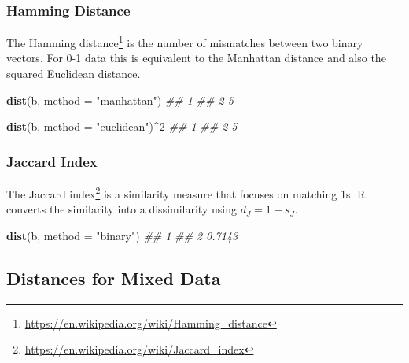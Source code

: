 \documentclass[
  notitlepage]{book}
\newenvironment{Shaded}{\begin{snugshade}}{\end{snugshade}}
\newcommand{\CommentTok}[1]{\textcolor[rgb]{0.56,0.35,0.01}{\textit{#1}}}
\newcommand{\DataTypeTok}[1]{\textcolor[rgb]{0.13,0.29,0.53}{#1}}
\newcommand{\DecValTok}[1]{\textcolor[rgb]{0.00,0.00,0.81}{#1}}
\newcommand{\KeywordTok}[1]{\textcolor[rgb]{0.13,0.29,0.53}{\textbf{#1}}}
\newcommand{\NormalTok}[1]{#1}
\newcommand{\OperatorTok}[1]{\textcolor[rgb]{0.81,0.36,0.00}{\textbf{#1}}}
\newcommand{\StringTok}[1]{\textcolor[rgb]{0.31,0.60,0.02}{#1}}
\DeclareRobustCommand{\href}[2]{#2\footnote{\url{#1}}}
\begin{document}
\hypertarget{hamming-distance}{%
\subsubsection{Hamming Distance}\label{hamming-distance}}

The \href{https://en.wikipedia.org/wiki/Hamming_distance}{Hamming distance}
is the number of mismatches between two binary vectors. For 0-1 data
this is equivalent to the Manhattan distance and also the squared
Euclidean distance.

\begin{Shaded}
\begin{Highlighting}[]
\KeywordTok{dist}\NormalTok{(b, }\DataTypeTok{method =} \StringTok{"manhattan"}\NormalTok{)}
\CommentTok{\#\#   1}
\CommentTok{\#\# 2 5}
\end{Highlighting}
\end{Shaded}

\begin{Shaded}
\begin{Highlighting}[]
\KeywordTok{dist}\NormalTok{(b, }\DataTypeTok{method =} \StringTok{"euclidean"}\NormalTok{)}\OperatorTok{\^{}}\DecValTok{2}
\CommentTok{\#\#   1}
\CommentTok{\#\# 2 5}
\end{Highlighting}
\end{Shaded}

\hypertarget{jaccard-index}{%
\subsubsection{Jaccard Index}\label{jaccard-index}}

The \href{https://en.wikipedia.org/wiki/Jaccard_index}{Jaccard index} is a
similarity measure that focuses on matching 1s. R converts the
similarity into a dissimilarity using \(d_{J} = 1 - s_{J}\).

\begin{Shaded}
\begin{Highlighting}[]
\KeywordTok{dist}\NormalTok{(b, }\DataTypeTok{method =} \StringTok{"binary"}\NormalTok{)}
\CommentTok{\#\#        1}
\CommentTok{\#\# 2 0.7143}
\end{Highlighting}
\end{Shaded}

\hypertarget{distances-for-mixed-data}{%
\subsection{Distances for Mixed Data}\label{distances-for-mixed-data}}
\end{document}
